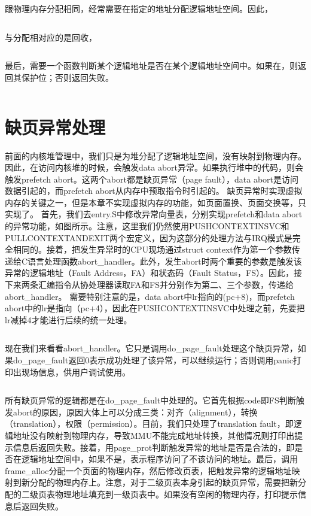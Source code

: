 \documentclass[main.tex]{subfiles}
\begin{document}
\begin{CJK*}{UTF8}{song}
跟物理内存分配相同，经常需要在指定的地址分配逻辑地址空间。因此，

\inputminted[firstline=49,lastline=110,linenos,numbersep=5pt,frame=lines,framesep=2mm]{c}{chapter04/kernel/page.c}

与分配相对应的是回收，

\inputminted[firstline=176,lastline=212,linenos,numbersep=5pt,frame=lines,framesep=2mm]{c}{chapter04/kernel/page.c}

最后，需要一个函数判断某个逻辑地址是否在某个逻辑地址空间中。如果在，则返回其保护位；否则返回失败。

\inputminted[firstline=214,lastline=237,linenos,numbersep=5pt,frame=lines,framesep=2mm]{c}{chapter04/kernel/page.c}

\section{缺页异常处理}
前面的内核堆管理中，我们只是为堆分配了逻辑地址空间，没有映射到物理内存。因此，在访问内核堆的时候，会触发data abort异常。如果执行堆中的代码，则会触发prefetch abort。这两个abort都是缺页异常（page fault），data abort是访问数据引起的，而prefetch abort从内存中预取指令时引起的。
缺页异常时实现虚拟内存的关键之一，但是本章不实现虚拟内存的功能，如页面置换、页面交换等，只实现了。
首先，我们去entry.S中修改异常向量表，分别实现prefetch和data abort的异常功能，如图所示。注意，这里我们仍然使用PUSHCONTEXTINSVC和PULLCONTEXTANDEXIT两个宏定义，因为这部分的处理方法与IRQ模式是完全相同的。接着，把发生异常时的CPU现场通过struct context作为第一个参数传递给C语言处理函数abort\_handler。此外，发生abort时两个重要的参数是触发该异常的逻辑地址（Fault Address，FA）和状态码（Fault Status，FS）。因此，接下来两条汇编指令从协处理器读取FA和FS并分别作为第二、三个参数，传递给abort\_handler。
需要特别注意的是，data abort中lr指向的(pc+8)，而prefetch abort中的lr是指向（pc+4），因此在PUSHCONTEXTINSVC中处理之前，先要把lr减掉4才能进行后续的统一处理。

\inputminted[firstline=155,lastline=176,linenos,numbersep=5pt,frame=lines,framesep=2mm]{gas}{chapter04/kernel/entry.S}

现在我们来看看abort\_handler。它只是调用do\_page\_fault处理这个缺页异常，如果do\_page\_fault返回0表示成功处理了该异常，可以继续运行；否则调用panic打印出现场信息，供用户调试使用。

\inputminted[firstline=356,lastline=362,linenos,numbersep=5pt,frame=lines,framesep=2mm]{c}{chapter04/kernel/machdep.c}

所有缺页异常的逻辑都是在do\_page\_fault中处理的。它首先根据code即FS判断触发abort的原因，原因大体上可以分成三类：对齐（alignment），转换（translation），权限（permission）。目前，我们只处理了translation fault，即逻辑地址没有映射到物理内存，导致MMU不能完成地址转换，其他情况则打印出提示信息后返回失败。接着，用page\_prot判断触发异常的地址是否是合法的，即是否在逻辑地址空间中，如果不是，表示程序访问了不该访问的地址。最后，调用frame\_alloc分配一个页面的物理内存，然后修改页表，把触发异常的逻辑地址映射到新分配的物理内存上。注意，对于二级页表本身引起的缺页异常，需要把新分配的二级页表物理地址填充到一级页表中。如果没有空闲的物理内存，打印提示信息后返回失败。


\end{CJK*}
\end{document}
